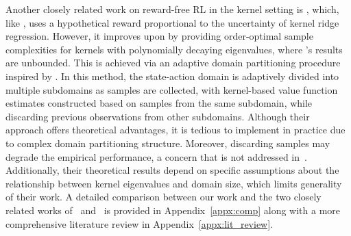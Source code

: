 Another closely related work on reward-free RL in the kernel setting is \citet{vakilireward}, which, like \citet{qiu2021reward}, uses a hypothetical reward proportional to the uncertainty of kernel ridge regression. However, it improves upon \citet{qiu2021reward} by providing order-optimal sample complexities for kernels with polynomially decaying eigenvalues, where \citet{qiu2021reward}'s results are unbounded. This is achieved via an adaptive domain partitioning procedure inspired by \citet{vakili2024kernelized}. In this method, the state-action domain is adaptively divided into multiple subdomains as samples are collected, with kernel-based value function estimates constructed based on samples from the same subdomain, while discarding previous observations from other subdomains. Although their approach offers theoretical advantages, it is tedious to implement in practice due to complex domain partitioning structure. Moreover, discarding samples may degrade the empirical performance, a concern that is not addressed in~\cite{vakilireward}. Additionally, their theoretical results depend on specific assumptions about the relationship between kernel eigenvalues and domain size, which limits generality of their work. A detailed comparison between our work and the two closely related works of~\citet{qiu2021reward} and~\citet{vakilireward} is provided in Appendix~\ref{appx:comp} along with a more comprehensive literature review in Appendix~\ref{appx:lit_review}.



